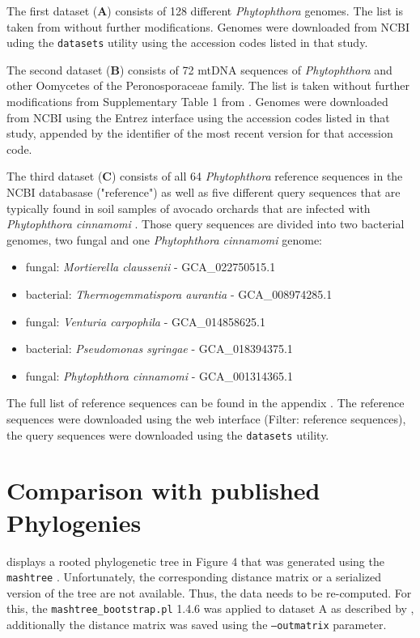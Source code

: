The first dataset (\textbf{A}) consists of 128 different \textit{Phytophthora}
genomes. The list is taken from \cite{mandalComparativeGenomeAnalysis2022}
without further modifications. Genomes were downloaded from NCBI uding the
\texttt{datasets} utility \cite{sayersDatabaseResourcesNational2022} using the
accession codes listed in that study.

The second dataset (\textbf{B}) consists of 72 mtDNA sequences of
\textit{Phytophthora}
and other Oomycetes of the Peronosporaceae family. The list is taken without
further modifications from Supplementary Table 1 from
\cite{winkworthComparativeAnalysesComplete2022}. Genomes were downloaded from
NCBI using the Entrez interface \cite{sayersDatabaseResourcesNational2022} using
the accession codes listed in that study, appended by the identifier of the most
recent version for that accession code.

The third dataset (\textbf{C}) consists of all 64 \textit{Phytophthora}
reference sequences in the NCBI databasase ("reference") as well as five
different query sequences that are typically found in soil samples of avocado
orchards that are infected with \textit{Phytophthora cinnamomi}
\cite{solis-garciaPhytophthoraRootRot2020}. Those query sequences are divided
into two bacterial genomes, two fungal and one \textit{Phytophthora cinnamomi}
genome:

\begin{itemize}
  \item fungal: \textit{Mortierella claussenii} - GCA\_022750515.1
  \item bacterial: \textit{Thermogemmatispora aurantia} - GCA\_008974285.1
  \item fungal: \textit{Venturia carpophila} - GCA\_014858625.1
  \item bacterial: \textit{Pseudomonas syringae} - GCA\_018394375.1
  \item fungal: \textit{Phytophthora cinnamomi} - GCA\_001314365.1
\end{itemize}

The full list of reference sequences can be found in the appendix .
The reference sequences were downloaded using the web interface (Filter:
reference sequences), the query sequences were downloaded using the
\texttt{datasets} utility.



\section{Comparison with published Phylogenies}
\cite{mandalComparativeGenomeAnalysis2022} displays a rooted phylogenetic tree
in Figure 4 that was generated using the \texttt{mashtree}
\cite{katzMashtreeRapidComparison2019,ondovMashFastGenome2016}. Unfortunately,
the corresponding distance matrix or a serialized version of the tree are not
available. Thus, the data needs to be re-computed. For this, the
\texttt{mashtree\_bootstrap.pl} 1.4.6 was applied to dataset A as described by
\cite{mandalComparativeGenomeAnalysis2022}, additionally the distance matrix was
saved using the \texttt{--outmatrix} parameter.

